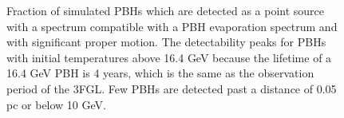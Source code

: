 \begin{figure}[htbp]
\begin{center}
\noindent
\end{center}
\caption{\small 
\label{fig:det_map}
Fraction of simulated PBHs which are detected as a point source with a spectrum compatible with a PBH evaporation spectrum and with significant proper motion. The detectability peaks for PBHs with initial temperatures above 16.4 GeV because the lifetime of a 16.4 GeV PBH is 4 years, which is the same as the observation period of the 3FGL. Few PBHs are detected past a distance of 0.05 pc or below 10 GeV.}

\end{figure}






